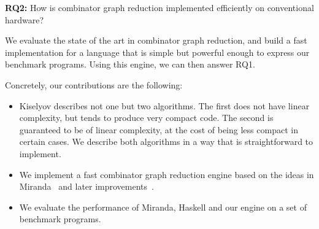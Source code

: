 \documentclass[conference]{IEEEtran}
\begin{document}
\textbf{RQ2:} How is combinator graph reduction implemented efficiently on conventional hardware?

We evaluate the state of the art in combinator graph reduction, and build a fast implementation for a language that is simple but powerful enough to express our benchmark programs.
Using this engine, we can then answer RQ1.

Concretely, our contributions are the following:
\begin{itemize}
    \item Kiselyov describes not one but two algorithms. The first does not have linear complexity, but tends to produce very compact code.
          The second is guaranteed to be of linear complexity, at the cost of being less compact in certain cases.
          We describe both algorithms in a way that is straightforward to implement.
    \item We implement a fast combinator graph reduction engine based on the ideas in Miranda~\cite{turner_miranda_1985} and later improvements~\cite{koopman_architecture_1992}.
    \item We evaluate the performance of Miranda, Haskell and our engine on a set of benchmark programs.
\end{itemize}



\end{document}
